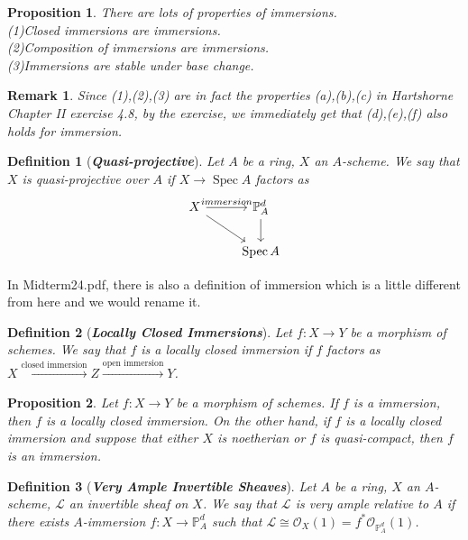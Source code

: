 \documentclass{ctexart}
\newtheorem{definition}{Definition}[section]
\newtheorem{remark}{Remark}[section]
\newtheorem{proposition}{Proposition}[section]
\newcommand{\spec}{\operatorname{Spec}}
\begin{document}
\begin{proposition}
    There are lots of properties of immersions. \\
    (1)Closed immersions are immersions. \\
    (2)Composition of immersions are immersions. \\
    (3)Immersions are stable under base change. 
    \label{Proposition 4.2}
\end{proposition}
\begin{remark}
    Since (1),(2),(3) are in fact the properties (a),(b),(c) in Hartshorne Chapter II exercise 4.8,
    by the exercise, we immediately get that (d),(e),(f) also holds for immersion.
\end{remark}
\begin{definition}[\textbf{\emph{Quasi-projective}}]
    Let $A$ be a ring, $X$ an $A$-scheme.
    We say that $X$ is quasi-projective over $A$ if $X \longrightarrow \spec A$ factors as 
    \begin{equation*}
        \begin{tikzcd}
            X \arrow[r, "immersion"] \arrow[dr] &
            \mathbb{P}_{A}^{d} \arrow[d] \\
            & \spec A
        \end{tikzcd}
    \end{equation*}
\end{definition}
In Midterm24.pdf, there is also a definition of immersion which is a little different from here and we would rename it.
\begin{definition}[\textbf{\emph{Locally Closed Immersions}}]
    Let $f: X \longrightarrow Y$ be a morphism of schemes.
    We say that $f$ is a locally closed immersion if $f$ factors as $X \overset{\text{closed immersion}}{\longrightarrow} Z \overset{\text{open immersion}}{\longrightarrow} Y$.
\end{definition}
\begin{proposition}
    Let $f: X \longrightarrow Y$ be a morphism of schemes.
    If $f$ is a immersion, then $f$ is a locally closed immersion.
    On the other hand, if $f$ is a locally closed immersion and suppose that either $X$ is noetherian or $f$ is quasi-compact, then $f$ is an immersion.
    \label{Proposition 4.3}
\end{proposition}
\begin{definition}[\textbf{\emph{Very Ample Invertible Sheaves}}]
    Let $A$ be a ring, $X$ an $A$-scheme, $\mathcal{L}$ an invertible sheaf on $X$.
    We say that $\mathcal{L}$ is very ample relative to $A$ if there exists $A$-immersion $f: X \longrightarrow \mathbb{P}_{A}^{d}$ such that $\mathcal{L} \cong \mathcal{O}_{X}(1) = f^{\ast}\mathcal{O}_{\mathbb{P}_{A}^{d}}(1)$.
\end{definition}
\end{document}
